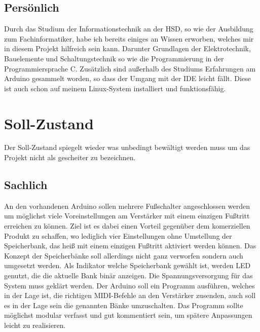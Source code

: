 \documentclass[10pt,a4paper]{report}
\begin{document}
	\subsection{Persönlich}
	\begin{flushleft}
Durch das Studium der Informationstechnik an der HSD, so wie der Ausbildung zum Fachinformatiker, habe ich bereits einiges an Wissen erworben, welches mir in diesem Projekt hilfreich sein kann. Darunter Grundlagen der Elektrotechnik, Bauelemente und Schaltungstechnik so wie die Programmierung in der Programmiersprache C. Zusätzlich sind außerhalb des Studiums Erfahrungen am Arduino gesammelt worden, so dass der Umgang mit der IDE leicht fällt. Diese ist auch schon auf meinem Linux-System installiert und funktionsfähig.
	\end{flushleft}
\section{Soll-Zustand}

Der Soll-Zustand spiegelt wieder was unbedingt bewältigt werden muss um das Projekt nicht als gescheiter zu bezeichnen.

	\subsection{Sachlich}
	\begin{flushleft}
	An den vorhandenen Arduino sollen mehrere Fußschalter angeschlossen werden um möglichst viele Voreinstellungen am Verstärker mit einem einzigen Fußtritt erreichen zu können. Ziel ist es dabei einen Vorteil gegenüber dem komerziellen Produkt zu schaffen, wo lediglich vier Einstellungen ohne Umstellung der Speicherbank, das heiß mit einem einzigen Fußtritt aktiviert werden können.
	Das Konzept der Speicherbänke soll allerdings nicht ganz verworfen sondern auch umgesetzt werden. Als Indikator welche Speicherbank gewählt ist, werden LED genutzt, die die aktuelle Bank binär anzeigen. Die Spannungsversorgung für das System muss geklärt werden.
	Der Arduino soll ein Programm ausführen, welches in der Lage ist, die richtigen MIDI-Befehle an den Verstärker zusenden, auch soll es in der Lage sein die genannten Bänke umzuschalten. Das Programm sollte möglichst modular verfasst und gut kommentiert sein, um spätere Anpassungen leicht zu realisieren.  
	\end{flushleft}
\end{document}
